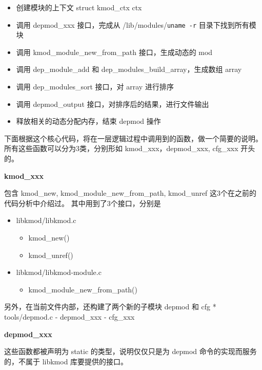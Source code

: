 \documentclass[11pt,a4paper]{article}
\begin{document}
\begin{itemize}
\item
  创建模块的上下文 struct kmod\_ctx ctx
\item
  调用 depmod\_xxx 接口，完成从 /lib/modules/\texttt{uname -r}
  目录下找到所有模块
\item
  调用 kmod\_module\_new\_from\_path 接口，生成动态的 mod
\item
  调用 dep\_module\_add 和 dep\_modules\_build\_array，生成数组 array
\item
  调用 dep\_modules\_sort 接口，对 array 进行排序
\item
  调用 depmod\_output 接口，对排序后的结果，进行文件输出
\item
  释放相关的动态分配内存，结束 depmod 操作
\end{itemize}
下面根据这个核心代码，将在一层逻辑过程中调用到的函数，做一个简要的说明。
所有这些函数可以分为3类，分别形如 kmod\_xxx，depmod\_xxx, cfg\_xxx
开头的。

\textbf{kmod\_xxx}

包含 kmod\_new, kmod\_module\_new\_from\_path, kmod\_unref
这3个在之前的代码分析中介绍过。 其中用到了3个接口，分别是

\begin{itemize}
\item
  libkmod/libkmod.c
  \begin{itemize}
  \item
    kmod\_new()
  \item
    kmod\_unref()
  \end{itemize}
\item
  libkmod/libkmod-module.c
  \begin{itemize}
  \item
    kmod\_module\_new\_from\_path()
  \end{itemize}
\end{itemize}
另外，在当前文件内部，还构建了两个新的子模块 depmod 和 cfg *
tools/depmod.c - depmod\_xxx - cfg\_xxx

\textbf{depmod\_xxx}

这些函数都被声明为 static 的类型，说明仅仅只是为 depmod
命令的实现而服务的，不属于 libkmod 库要提供的接口。
\end{document}
